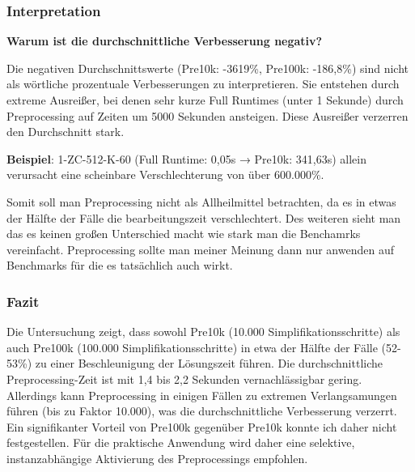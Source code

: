 \subsubsection{Interpretation}

\textbf{Warum ist die durchschnittliche Verbesserung negativ?}

Die negativen Durchschnittswerte (Pre10k: -3619\%, Pre100k: -186,8\%) sind nicht als wörtliche 
prozentuale Verbesserungen zu interpretieren. Sie entstehen durch extreme Ausreißer, bei denen sehr 
kurze Full Runtimes (unter 1 Sekunde) durch Preprocessing auf Zeiten um 5000 Sekunden ansteigen. 
Diese Ausreißer verzerren den Durchschnitt stark.

\textbf{Beispiel}: 1-ZC-512-K-60 (Full Runtime: 0,05s → Pre10k: 341,63s) allein verursacht eine 
scheinbare Verschlechterung von über 600.000\%.

Somit soll man Preprocessing nicht als Allheilmittel betrachten, da es in etwas der Hälfte der Fälle 
die bearbeitungszeit verschlechtert. Des weiteren sieht man das es keinen großen Unterschied macht wie stark man 
die Benchamrks vereinfacht. Preprocessing sollte man meiner Meinung dann nur anwenden auf Benchmarks 
für die es tatsächlich auch wirkt.

\subsubsection{Fazit}

Die Untersuchung zeigt, dass sowohl Pre10k (10.000 Simplifikationsschritte) als auch Pre100k (100.000 Simplifikationsschritte) 
in etwa der Hälfte der Fälle (52-53\%) zu einer Beschleunigung der Lösungszeit führen. Die 
durchschnittliche Preprocessing-Zeit ist mit 1,4 bis 2,2 Sekunden vernachlässigbar gering. Allerdings 
kann Preprocessing in einigen Fällen zu extremen Verlangsamungen führen (bis zu Faktor 10.000), was 
die durchschnittliche Verbesserung verzerrt. Ein signifikanter Vorteil von Pre100k gegenüber Pre10k 
konnte ich daher nicht festgestellen. Für die praktische Anwendung wird daher eine selektive, 
instanzabhängige Aktivierung des Preprocessings empfohlen.





